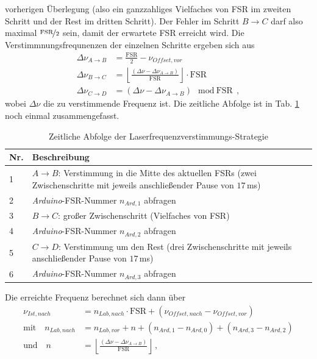 vorherigen Überlegung (also ein ganzzahliges Vielfaches von FSR im zweiten
Schritt und der Rest im dritten Schritt). Der Fehler im Schritt $B\rightarrow C$
darf also maximal $\nicefrac{\text{FSR}}{2}$ sein, damit der erwartete FSR erreicht wird. Die Verstimmnungsfrequnenzen der einzelnen Schritte ergeben sich aus
\begin{equation}\label{eq:scan-strategie_schritte}
	\begin{split}
		\Delta\nu_{A\rightarrow B}&=\frac{\text{FSR}}{2}-\nu_{Offset,vor}\\
		\Delta\nu_{B\rightarrow
		C}&=\left\lfloor\frac{(\Delta\nu-\Delta\nu_{A\rightarrow
		B})}{\text{FSR}}\right\rfloor\cdot\text{FSR}\\
		\Delta\nu_{C\rightarrow D}&=(\Delta\nu-\Delta\nu_{A\rightarrow
		B})\mod\text{FSR}\,,
	\end{split}
\end{equation}
wobei $\Delta\nu$ die zu verstimmende Frequenz ist.
Die zeitliche Abfolge ist in Tab. \ref{tab:scan-strategie_abfolge} noch einmal
zusammengefasst.
\begin{table}
	\begin{tabular}{p{}p{}}
		\toprule
			Nr. & Beschreibung \\
		\midrule[1px]
		\hline
			1 & $A\rightarrow B$: Verstimmung in die Mitte des aktuellen FSRs (zwei
			Zwischenschritte mit jeweils anschließender Pause von $17\,$ms)\\
			2 & \textit{Arduino}-FSR-Nummer $n_{Ard,1}$ abfragen\\
			3 & $B\rightarrow C$: großer Zwischenschritt (Vielfaches von FSR)\\
			4 & \textit{Arduino}-FSR-Nummer $n_{Ard,2}$ abfragen\\
			5 & $C\rightarrow D$: Verstimmung um den Rest (drei Zwischenschritte mit
			jeweils anschließender Pause von $17\,$ms)\\
			6 & \textit{Arduino}-FSR-Nummer $n_{Ard,3}$ abfragen\\
		\bottomrule[1px]
	\end{tabular}
	\caption[Laserfrequenzverstimmungs-Strategie]{Zeitliche Abfolge der
	Laserfrequenzverstimmungs-Strategie}
	\label{tab:scan-strategie_abfolge}
\end{table}
Die erreichte Frequenz berechnet sich dann über
\begin{equation}\label{eq:neue_frequenz_strategie_2}
	\begin{split}
		\nu_{Ist,nach} &=
		n_{Lab,nach}\cdot\text{FSR}+(\nu_{Offset,nach}-\nu_{Offset,vor})\\
		\text{mit}\quad
		n_{Lab,nach} &= n_{Lab,vor}+n+(n_{Ard,1}-n_{Ard,0})+(n_{Ard,3}-n_{Ard,2})\\
		\text{und}\quad
		n &= \left\lfloor\frac{(\Delta\nu-\Delta\nu_{A\rightarrow
		B})}{\text{FSR}}\right\rfloor\,,
	\end{split}
\end{equation}
